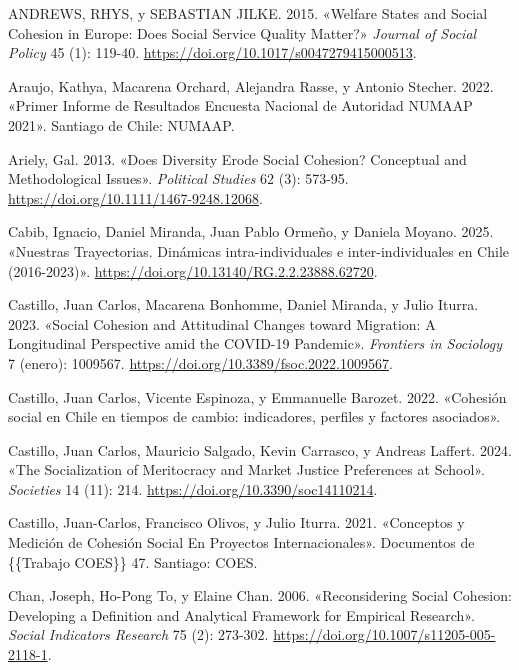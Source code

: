 \documentclass[
  letterpaper,
  DIV=11,
  numbers=noendperiod]{scrartcl}
\newlength{\cslhangindent}
\newenvironment{CSLReferences}[2] %
 {\begin{list}{}{%
  \setlength{\itemindent}{0pt}
  \setlength{\leftmargin}{0pt}
  \setlength{\parsep}{0pt}
  \ifodd #1
   \setlength{\leftmargin}{\cslhangindent}
   \setlength{\itemindent}{-1\cslhangindent}
  \fi
  \setlength{\itemsep}{#2\baselineskip}}}
 {\end{list}}
\begin{document}
\label{refs}
\begin{CSLReferences}{1}{0}
ANDREWS, RHYS, y SEBASTIAN JILKE. 2015. {«Welfare {States} and {Social
Cohesion} in {Europe}: {Does Social Service Quality Matter}?»}
\emph{Journal of Social Policy} 45 (1): 119-40.
\url{https://doi.org/10.1017/s0047279415000513}.

Araujo, Kathya, Macarena Orchard, Alejandra Rasse, y Antonio Stecher.
2022. {«Primer {Informe} de {Resultados Encuesta Nacional} de {Autoridad
NUMAAP} 2021»}. Santiago de Chile: NUMAAP.

Ariely, Gal. 2013. {«Does {Diversity Erode Social Cohesion}?
{Conceptual} and {Methodological Issues}»}. \emph{Political Studies} 62
(3): 573-95. \url{https://doi.org/10.1111/1467-9248.12068}.

Cabib, Ignacio, Daniel Miranda, Juan Pablo Ormeño, y Daniela Moyano.
2025. {«{Nuestras Trayectorias. Din{á}micas intra-individuales e
inter-individuales en Chile (2016-2023)}»}.
\url{https://doi.org/10.13140/RG.2.2.23888.62720}.

Castillo, Juan Carlos, Macarena Bonhomme, Daniel Miranda, y Julio
Iturra. 2023. {«Social Cohesion and Attitudinal Changes toward
Migration: {A} Longitudinal Perspective amid the {COVID-19} Pandemic»}.
\emph{Frontiers in Sociology} 7 (enero): 1009567.
\url{https://doi.org/10.3389/fsoc.2022.1009567}.

Castillo, Juan Carlos, Vicente Espinoza, y Emmanuelle Barozet. 2022.
{«{Cohesi{ó}n social en Chile en tiempos de cambio: indicadores,
perfiles y factores asociados}»}.

Castillo, Juan Carlos, Mauricio Salgado, Kevin Carrasco, y Andreas
Laffert. 2024. {«The {Socialization} of {Meritocracy} and {Market
Justice Preferences} at {School}»}. \emph{Societies} 14 (11): 214.
\url{https://doi.org/10.3390/soc14110214}.

Castillo, Juan-Carlos, Francisco Olivos, y Julio Iturra. 2021.
{«Conceptos y Medici{ó}n de Cohesi{ó}n Social En Proyectos
Internacionales»}. Documentos de \{\{Trabajo COES\}\} 47. Santiago:
COES.

Chan, Joseph, Ho-Pong To, y Elaine Chan. 2006. {«Reconsidering {Social
Cohesion}: {Developing} a {Definition} and {Analytical Framework} for
{Empirical Research}»}. \emph{Social Indicators Research} 75 (2):
273-302. \url{https://doi.org/10.1007/s11205-005-2118-1}.


\end{CSLReferences}
\end{document}

